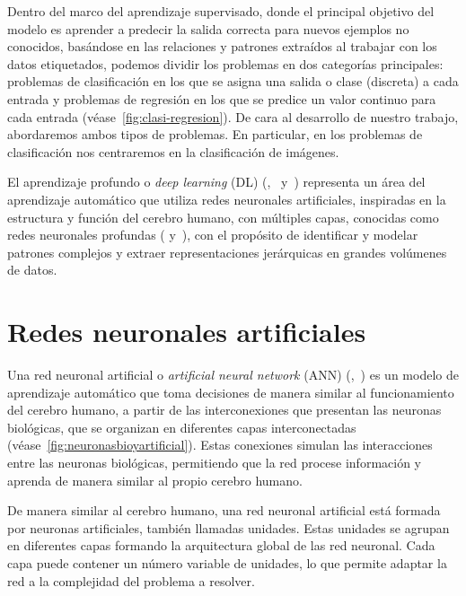 Dentro del marco del aprendizaje supervisado, donde el principal objetivo del modelo es aprender a predecir la salida correcta para nuevos ejemplos no conocidos, basándose en las relaciones y patrones extraídos al trabajar con los datos etiquetados, podemos dividir los problemas en dos categorías principales: problemas de clasificación en los que se asigna una salida o clase (discreta) a cada entrada y problemas de regresión en los que se predice un valor continuo para cada entrada (véase~\autoref{fig:clasi-regresion}). De cara al desarrollo de nuestro trabajo, abordaremos ambos tipos de problemas. En particular, en los problemas de clasificación nos centraremos en la clasificación de imágenes.\newline

El aprendizaje profundo o \emph{deep learning} (DL) (\cite{Bishop2023},~\cite{Prince2023} y~\cite{LeCun2015}) representa un área del aprendizaje automático que utiliza redes neuronales artificiales, inspiradas en la estructura y función del cerebro humano, con múltiples capas, conocidas como redes neuronales profundas (\cite{Goodfellow2016} y~\cite{Schmidhuber2015}), con el propósito de identificar y modelar patrones complejos y extraer representaciones jerárquicas en grandes volúmenes de datos.\newline

\section{Redes neuronales artificiales}\label{sec:redes-neuronales-artificiales}

Una red neuronal artificial o \emph{artificial neural network} (ANN) (\cite{Bishop1995},~\cite{Ripley1996}) es un modelo de aprendizaje automático que toma decisiones de manera similar al funcionamiento del cerebro humano, a partir de las interconexiones que presentan las neuronas biológicas, que se organizan en diferentes capas interconectadas (véase~\autoref{fig:neuronasbioyartificial}). Estas conexiones simulan las interacciones entre las neuronas biológicas, permitiendo que la red procese información y aprenda de manera similar al propio cerebro humano.\newline

De manera similar al cerebro humano, una red neuronal artificial está formada por neuronas artificiales, también llamadas unidades. Estas unidades se agrupan en diferentes capas formando la arquitectura global de las red neuronal. Cada capa puede contener un número variable de unidades, lo que permite adaptar la red a la complejidad del problema a resolver.\newline

